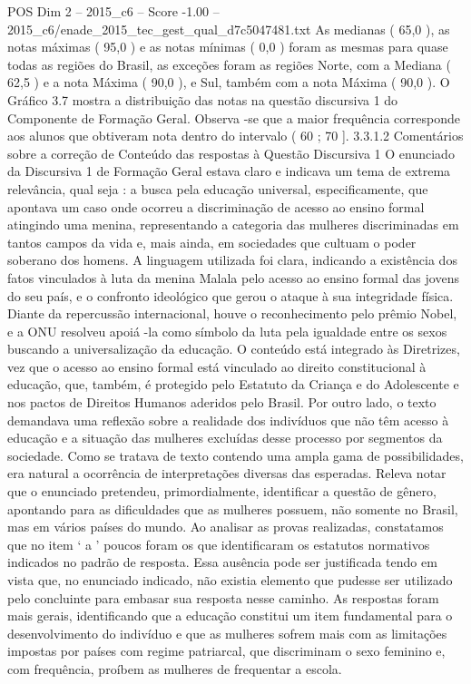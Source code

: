 \begin{textsample}{POS Dim 2 – 2015\_c6 – Score -1.00 – 2015\_c6/enade\_2015\_tec\_gest\_qual\_d7c5047481.txt}
As medianas ( 65,0 ), as notas máximas ( 95,0 ) e as notas mínimas ( 0,0 ) foram as mesmas para quase todas as regiões do Brasil, as exceções foram as regiões Norte, com a Mediana ( 62,5 ) e a nota Máxima ( 90,0 ), e Sul, também com a nota Máxima ( 90,0 ).
O Gráfico 3.7 mostra a distribuição das notas na questão discursiva 1 do Componente de Formação Geral.
Observa -se que a maior frequência corresponde aos alunos que obtiveram nota dentro do intervalo ( 60 ; 70 ]. 3.3.1.2 Comentários sobre a correção de Conteúdo das respostas à Questão Discursiva 1 O enunciado da Discursiva 1 de Formação Geral estava claro e indicava um tema de extrema relevância, qual seja : a busca pela educação universal, especificamente, que apontava um caso onde ocorreu a discriminação de acesso ao ensino formal atingindo uma menina, representando a categoria das mulheres discriminadas em tantos campos da vida e, mais ainda, em sociedades que cultuam o poder soberano dos homens.
A linguagem utilizada foi clara, indicando a existência dos fatos vinculados à luta da menina Malala pelo acesso ao ensino formal das jovens do seu país, e o confronto ideológico que gerou o ataque à sua integridade física.
Diante da repercussão internacional, houve o reconhecimento pelo prêmio Nobel, e a ONU resolveu apoiá -la como símbolo da luta pela igualdade entre os sexos buscando a universalização da educação.
O conteúdo está integrado às Diretrizes, vez que o acesso ao ensino formal está vinculado ao direito constitucional à educação, que, também, é protegido pelo Estatuto da Criança e do Adolescente e nos pactos de Direitos Humanos aderidos pelo Brasil.
Por outro lado, o texto demandava uma reflexão sobre a realidade dos indivíduos que não têm acesso à educação e a situação das mulheres excluídas desse processo por segmentos da sociedade.
Como se tratava de texto contendo uma ampla gama de possibilidades, era natural a ocorrência de interpretações diversas das esperadas.
Releva notar que o enunciado pretendeu, primordialmente, identificar a questão de gênero, apontando para as dificuldades que as mulheres possuem, não somente no Brasil, mas em vários países do mundo.
Ao analisar as provas realizadas, constatamos que no item ‘ a ’ poucos foram os que identificaram os estatutos normativos indicados no padrão de resposta.
Essa ausência pode ser justificada tendo em vista que, no enunciado indicado, não existia elemento que pudesse ser utilizado pelo concluinte para embasar sua resposta nesse caminho.
As respostas foram mais gerais, identificando que a educação constitui um item fundamental para o desenvolvimento do indivíduo e que as mulheres sofrem mais com as limitações impostas por países com regime patriarcal, que discriminam o sexo feminino e, com frequência, proíbem as mulheres de frequentar a escola.

\end{textsample}
